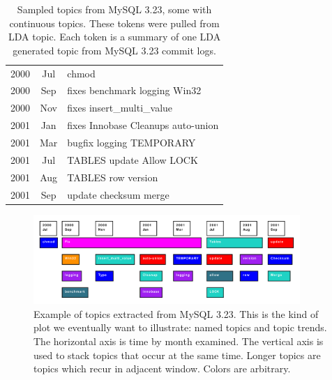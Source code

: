 \documentclass[times, 10pt,twocolumn]{article}
\begin{document}
\begin{table}
\centering
\begin{tabular}{|cc|l|}
\hline
2000 &  Jul &      chmod \\
2000 &  Sep &      fixes benchmark logging Win32 \\
2000 &  Nov &      fixes insert\_multi\_value \\
2001 &  Jan &      fixes Innobase Cleanups auto-union \\
2001 &  Mar &      bugfix logging  TEMPORARY  \\
\hline         
2001 &  Jul &      TABLES update Allow LOCK \\ 
               
2001 &  Aug &      TABLES row version \\
\hline         
2001 &  Sep &      update checksum merge \\
\hline
\end{tabular}
\caption{Sampled topics from MySQL 3.23, some with continuous topics. These tokens were pulled from LDA topic. Each token is a summary of one LDA generated topic from MySQL 3.23 commit logs.}
\label{tab:portability}
\end{table}



\begin{figure}
  \centering
  \includegraphics[width=0.9\textwidth]{lda}
  \caption{Example of topics extracted from MySQL 3.23. This is the
    kind of plot we eventually want to illustrate: named topics and
    topic trends. The horizontal axis is time by month examined. The
    vertical axis is used to stack topics that occur at the same
    time. Longer topics are topics which recur in adjacent
    window. Colors are arbitrary.}
  \label{fig:lda}
\end{figure}
\end{document}
